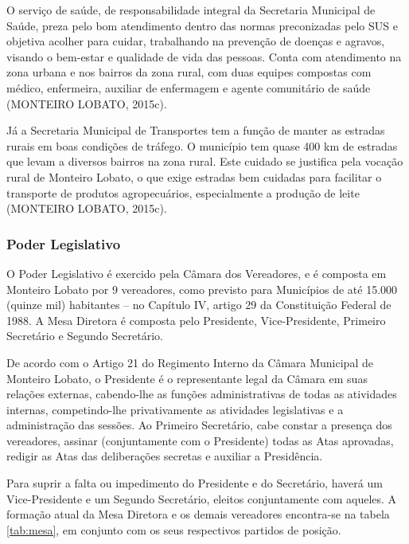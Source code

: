 O serviço de saúde, de responsabilidade integral da Secretaria Municipal de Saúde, preza pelo bom atendimento dentro das normas preconizadas pelo SUS e objetiva acolher para cuidar, trabalhando na prevenção de doenças e agravos, visando o bem-estar e qualidade de vida das pessoas. Conta com atendimento na zona urbana e nos bairros da zona rural, com duas equipes compostas com médico, enfermeira, auxiliar de enfermagem e agente comunitário de saúde (MONTEIRO LOBATO, 2015c).

Já a Secretaria Municipal de Transportes tem a função de manter as estradas rurais em boas condições de tráfego. O município tem quase 400 km de estradas que levam a diversos bairros na zona rural. Este cuidado se justifica pela vocação rural de Monteiro Lobato, o que exige estradas bem cuidadas para facilitar o transporte de produtos agropecuários, especialmente a produção de leite (MONTEIRO LOBATO, 2015c).

%	

\subsubsection{Poder Legislativo}
O Poder Legislativo é exercido pela Câmara dos Vereadores, e é composta em Monteiro Lobato por 9 vereadores, como previsto para Municípios de até 15.000 (quinze mil) habitantes – no Capítulo IV, artigo 29 da Constituição Federal de 1988. A Mesa Diretora é composta pelo Presidente, Vice-Presidente, Primeiro Secretário e Segundo Secretário.

De acordo com o Artigo 21 do Regimento Interno da Câmara Municipal de Monteiro Lobato, o Presidente é o representante legal da Câmara em suas relações externas, cabendo-lhe as funções administrativas de todas as atividades internas, competindo-lhe privativamente as atividades legislativas e a administração das sessões. Ao Primeiro Secretário, cabe constar a presença dos vereadores, assinar (conjuntamente com o Presidente) todas as Atas aprovadas, redigir as Atas das deliberações secretas e auxiliar a Presidência.

Para suprir a falta ou impedimento do Presidente e do Secretário, haverá um Vice-Presidente e um Segundo Secretário, eleitos conjuntamente com aqueles. A formação atual da Mesa Diretora e os demais vereadores encontra-se na tabela \autoref{tab:mesa}, em conjunto com os seus respectivos partidos de posição.

%	

